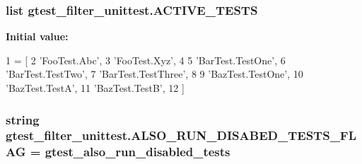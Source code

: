 \subsubsection[{A\+C\+T\+I\+V\+E\+\_\+\+T\+E\+S\+T\+S}]{\setlength{\rightskip}{0pt plus 5cm}list gtest\+\_\+filter\+\_\+unittest.\+A\+C\+T\+I\+V\+E\+\_\+\+T\+E\+S\+T\+S}\label{namespacegtest__filter__unittest_a8eb26cb0e0ac81737723cc9d16e1d253}
{\bfseries Initial value\+:}
\begin{DoxyCode}
1 = [
2     \textcolor{stringliteral}{'FooTest.Abc'},
3     \textcolor{stringliteral}{'FooTest.Xyz'},
4 
5     \textcolor{stringliteral}{'BarTest.TestOne'},
6     \textcolor{stringliteral}{'BarTest.TestTwo'},
7     \textcolor{stringliteral}{'BarTest.TestThree'},
8 
9     \textcolor{stringliteral}{'BazTest.TestOne'},
10     \textcolor{stringliteral}{'BazTest.TestA'},
11     \textcolor{stringliteral}{'BazTest.TestB'},
12     ]
\end{DoxyCode}
\hypertarget{namespacegtest__filter__unittest_aa2da713fbaa08fdbaa7cd78c45974edf}{}
\subsubsection[{A\+L\+S\+O\+\_\+\+R\+U\+N\+\_\+\+D\+I\+S\+A\+B\+E\+D\+\_\+\+T\+E\+S\+T\+S\+\_\+\+F\+L\+A\+G}]{\setlength{\rightskip}{0pt plus 5cm}string gtest\+\_\+filter\+\_\+unittest.\+A\+L\+S\+O\+\_\+\+R\+U\+N\+\_\+\+D\+I\+S\+A\+B\+E\+D\+\_\+\+T\+E\+S\+T\+S\+\_\+\+F\+L\+A\+G = \textquotesingle{}gtest\+\_\+also\+\_\+run\+\_\+disabled\+\_\+tests\textquotesingle{}}\label{namespacegtest__filter__unittest_aa2da713fbaa08fdbaa7cd78c45974edf}
\hypertarget{namespacegtest__filter__unittest_a18b756ed54ae48287c75fe522af10a9c}{}
